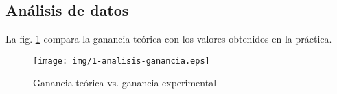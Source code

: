 \subsection{Análisis de datos}

La fig. \ref{fig:1-analisis:ganancia} compara la ganancia teórica con los valores obtenidos en la práctica.

\begin{figure}[H]
    \texttt{[image: img/1-analisis-ganancia.eps]}
    \caption{Ganancia teórica vs. ganancia experimental}
    \label{fig:1-analisis:ganancia}
\end{figure}

